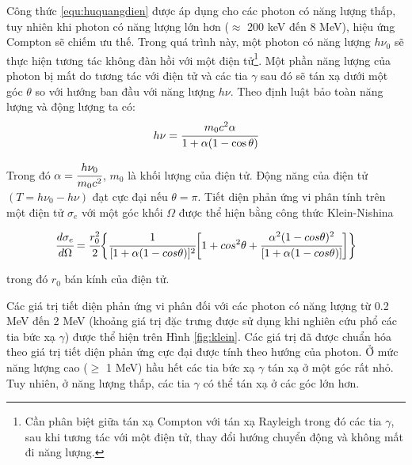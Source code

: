 Công thức \ref{equ:huquangdien} được áp dụng cho các photon có năng lượng thấp, tuy nhiên khi photon có năng lượng lớn hơn ($\approx$ 200 keV đến 8 MeV), hiệu ứng Compton sẽ chiếm ưu thế. Trong quá trình này, một photon có năng lượng $h\nu_{0}$ sẽ thực hiện tương tác không đàn hồi với một điện tử\footnote{Cần phân biệt giữa tán xạ Compton với tán xạ Rayleigh trong đó các tia $\gamma$, sau khi tương tác với một điện tử, thay đổi hướng chuyển động và không mất đi năng lượng.}. Một phần năng lượng của photon bị mất do tương tác với điện tử và các tia $\gamma$ sau  đó sẽ tán xạ dưới một góc $\theta$  so với hướng ban đầu với năng lượng $h\nu$. Theo định luật bảo toàn năng lượng và động lượng ta có: %
\begin{equation}
	h\nu=\cfrac{m_{0}c^{2}\alpha}{1+\alpha(1-\cos{\theta})}
\end{equation}

Trong đó $\alpha=\cfrac{h\nu_{0}}{m_{0}c^{2}}$, $m_{0}$ là khối lượng của điện tử. Động năng của điện tử $(T=h\nu_{0}-h\nu)$ đạt cực 	đại nếu $\theta=\pi$. Tiết diện phản ứng vi phân tính trên một điện tử $\sigma_{e}$  với một góc khối $\Omega$ được thể hiện bằng công thức Klein-Nishina \cite{bib_Klein}

\begin{equation}
\cfrac{d \sigma_{e}}{d \Omega} = \cfrac{r_{0}^{2}}{2} 
\biggl\{
 \cfrac{1}{[1+\alpha(1-cos\theta)]^{2}}
 \biggl [
	1+cos^{2}\theta+\cfrac{\alpha^{2}(1-cos\theta)^{2}}{[1+\alpha (1-cos\theta)]}
 \biggr ]
\biggr\}
\end{equation}

trong đó $r_{0}$ bán kính của điện tử. 

Các giá trị tiết diện phản ứng vi phân đối với các photon có năng lượng từ 0.2 MeV đến 2 MeV (khoảng giá trị đặc trưng được sử dụng khi nghiên cứu phổ các tia bức xạ $\gamma$) được thể hiện trên Hình \ref{fig:klein}. Các giá trị đã được chuẩn hóa theo giá trị tiết diện phản ứng cực đại được tính theo hướng của photon. Ở mức năng lượng cao ($\geq$ 1 MeV) hầu hết các tia bức xạ $\gamma$ tán xạ ở một góc rất nhỏ. Tuy nhiên, ở năng lượng thấp, các tia $\gamma$ có thể tán xạ ở các góc lớn hơn. %

